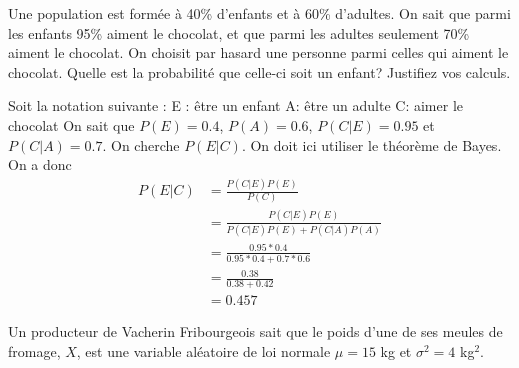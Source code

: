 \begin{questions}
\question[5]
Une population est formée à 40\% d'enfants et à 60\% d'adultes. On sait que parmi les enfants 95\% aiment le chocolat, et que parmi les adultes seulement 70\% aiment le chocolat. On choisit par hasard une personne parmi celles qui aiment le chocolat. Quelle est la probabilité que celle-ci soit un enfant? Justifiez vos calculs.
\begin{solution}
Soit la notation suivante : 
E : être un enfant
A: être un adulte
C: aimer le chocolat
On sait que $P(E)=0.4$, $P(A)=0.6$, $P(C|E)=0.95$ et $P(C|A)=0.7$.
On cherche $P(E|C)$.
On doit ici utiliser le théorème de Bayes. On a donc 
\begin{align}
    P(E|C) &= \frac{P(C|E)P(E)}{P(C)}\\
    &= \frac{P(C|E)P(E)}{P(C|E)P(E) + P(C|A)P(A)} \\
    &= \frac{0.95 * 0.4}{0.95 * 0.4 + 0.7*0.6}\\
    &= \frac{0.38}{0.38+0.42} \\
    &= 0.457
\end{align}
\end{solution}

\vspace{5cm}



\vspace{8cm}


\newpage

\question Un producteur de Vacherin Fribourgeois sait que le poids d'une de ses meules de fromage, $X$, est une variable aléatoire de loi normale $\mu=15$ kg et $\sigma^2 = 4$ kg$^2$.%

\end{questions}
